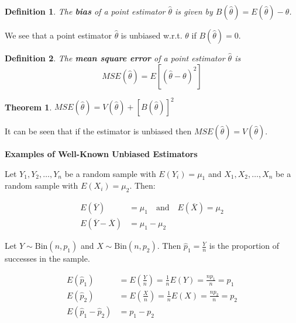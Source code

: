\documentclass[a4paper,12pt]{article}
\theoremstyle{nonitalic}
\newtheorem{definition}{Definition}[subsection]
\newtheorem{theorem}{Theorem}[subsection]
\begin{document}
    \bigskip

    \begin{definition}
        The \textbf{bias} of a point estimator $\hat{\theta}$ is given by $B(\hat{\theta}) = E(\hat{\theta}) - \theta$.
    \end{definition}
    We see that a point estimator $\hat{\theta}$ is unbiased w.r.t. $\theta$ if $B(\hat{\theta}) = 0$.

    \bigskip
        
    \begin{definition}
        The \textbf{mean square error} of a point estimator $\hat{\theta}$ is
        \[
            MSE(\hat{\theta}) = E\left[ (\hat{\theta} - \theta)^2 \right]
        \]
    \end{definition}

    \begin{theorem}
        $MSE(\hat{\theta}) = V(\hat{\theta}) + \left[B(\hat{\theta})\right]^2$
    \end{theorem}
    It can be seen that if the estimator is unbiased then $MSE(\hat{\theta}) = V(\hat{\theta})$.

    \bigskip

    \textbf{Examples of Well-Known Unbiased Estimators}

    Let $Y_1, Y_2, \ldots, Y_n$ be a random sample with $E(Y_i) = \mu_1$ and $X_1, X_2, \ldots, X_n$ be a random sample with $E(X_i) = \mu_2$. Then:

    \begin{align*}
        E\left(\overline{Y}\right) &= \mu_1 \quad \text{and} \quad E\left(\overline{X}\right) = \mu_2\\
        E\left(\overline{Y} - \overline{X}\right) &= \mu_1 - \mu_2
    \end{align*}
    
    Let $Y \sim \text{Bin}(n, p_1)$ and $X \sim \text{Bin}(n, p_2)$. Then $\hat{p}_1 = \frac{Y}{n}$ is the proportion of successes in the sample.
    
    \begin{align*}
        E\left(\hat{p}_1\right) &= E\left(\frac{Y}{n}\right) = \frac{1}{n} E(Y) = \frac{np_1}{n} = p_1\\
        E\left(\hat{p}_2\right) &= E\left(\frac{X}{n}\right) = \frac{1}{n} E(X) = \frac{np_2}{n} = p_2\\
        E\left(\hat{p}_1 - \hat{p}_2\right) &= p_1 - p_2
    \end{align*}

    \newpage
\end{document}
